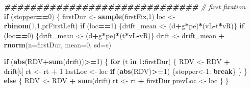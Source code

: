 \documentclass[
]{book}
\newenvironment{Shaded}{\begin{snugshade}}{\end{snugshade}}
\newcommand{\AttributeTok}[1]{\textcolor[rgb]{0.13,0.29,0.53}{#1}}
\newcommand{\CommentTok}[1]{\textcolor[rgb]{0.56,0.35,0.01}{\textit{#1}}}
\newcommand{\ControlFlowTok}[1]{\textcolor[rgb]{0.13,0.29,0.53}{\textbf{#1}}}
\newcommand{\DecValTok}[1]{\textcolor[rgb]{0.00,0.00,0.81}{#1}}
\newcommand{\DocumentationTok}[1]{\textcolor[rgb]{0.56,0.35,0.01}{\textbf{\textit{#1}}}}
\newcommand{\FunctionTok}[1]{\textcolor[rgb]{0.13,0.29,0.53}{\textbf{#1}}}
\newcommand{\NormalTok}[1]{#1}
\newcommand{\OtherTok}[1]{\textcolor[rgb]{0.56,0.35,0.01}{#1}}
\newcommand{\SpecialCharTok}[1]{\textcolor[rgb]{0.81,0.36,0.00}{\textbf{#1}}}
\begin{document}
\begin{Shaded}
\begin{Highlighting}[]
  \DocumentationTok{\#\#\#\#\#\#\#\#\#\#\#\#\#\#\#\#\#\#\#\#\#\#\#\#\#\#\#\#\#\#}
  \CommentTok{\# first fixation}
  \ControlFlowTok{if}\NormalTok{ (stopper}\SpecialCharTok{==}\DecValTok{0}\NormalTok{) \{}
\NormalTok{    firstDur }\OtherTok{\textless{}{-}} \FunctionTok{sample}\NormalTok{(firstFix,}\DecValTok{1}\NormalTok{)}
\NormalTok{    loc }\OtherTok{\textless{}{-}} \FunctionTok{rbinom}\NormalTok{(}\DecValTok{1}\NormalTok{,}\DecValTok{1}\NormalTok{,prFirstLeft)}
    \ControlFlowTok{if}\NormalTok{ (loc}\SpecialCharTok{==}\DecValTok{1}\NormalTok{) \{drift\_mean }\OtherTok{\textless{}{-}}\NormalTok{ (d}\SpecialCharTok{+}\NormalTok{g}\SpecialCharTok{*}\NormalTok{pe)}\SpecialCharTok{*}\NormalTok{(vL}\SpecialCharTok{{-}}\NormalTok{t}\SpecialCharTok{*}\NormalTok{vR)\}}
    \ControlFlowTok{if}\NormalTok{ (loc}\SpecialCharTok{==}\DecValTok{0}\NormalTok{) \{drift\_mean }\OtherTok{\textless{}{-}}\NormalTok{ (d}\SpecialCharTok{+}\NormalTok{g}\SpecialCharTok{*}\NormalTok{pe)}\SpecialCharTok{*}\NormalTok{(t}\SpecialCharTok{*}\NormalTok{vL}\SpecialCharTok{{-}}\NormalTok{vR)\}}
\NormalTok{    drift }\OtherTok{\textless{}{-}}\NormalTok{ drift\_mean }\SpecialCharTok{+} \FunctionTok{rnorm}\NormalTok{(}\AttributeTok{n=}\NormalTok{firstDur, }\AttributeTok{mean=}\DecValTok{0}\NormalTok{, }\AttributeTok{sd=}\NormalTok{s)}
  
    \ControlFlowTok{if}\NormalTok{ (}\FunctionTok{abs}\NormalTok{(RDV}\SpecialCharTok{+}\FunctionTok{sum}\NormalTok{(drift))}\SpecialCharTok{\textgreater{}=}\DecValTok{1}\NormalTok{) \{}
      \ControlFlowTok{for}\NormalTok{ (t }\ControlFlowTok{in} \DecValTok{1}\SpecialCharTok{:}\NormalTok{firstDur) \{}
\NormalTok{        RDV }\OtherTok{\textless{}{-}}\NormalTok{ RDV }\SpecialCharTok{+}\NormalTok{ drift[t]}
\NormalTok{        rt }\OtherTok{\textless{}{-}}\NormalTok{ rt }\SpecialCharTok{+} \DecValTok{1}
\NormalTok{        lastLoc }\OtherTok{\textless{}{-}}\NormalTok{ loc}
        \ControlFlowTok{if}\NormalTok{ (}\FunctionTok{abs}\NormalTok{(RDV)}\SpecialCharTok{\textgreater{}=}\DecValTok{1}\NormalTok{) \{stopper}\OtherTok{\textless{}{-}}\DecValTok{1}\NormalTok{; }\ControlFlowTok{break}\NormalTok{\}}
\NormalTok{      \}}
\NormalTok{    \} }\ControlFlowTok{else}\NormalTok{ \{}
\NormalTok{      RDV }\OtherTok{\textless{}{-}}\NormalTok{ RDV }\SpecialCharTok{+} \FunctionTok{sum}\NormalTok{(drift)}
\NormalTok{      rt }\OtherTok{\textless{}{-}}\NormalTok{ rt }\SpecialCharTok{+}\NormalTok{ firstDur}
\NormalTok{      prevLoc }\OtherTok{\textless{}{-}}\NormalTok{ loc}
\NormalTok{    \}}
\NormalTok{  \}}
  

\end{Highlighting}
\end{Shaded}
\end{document}
